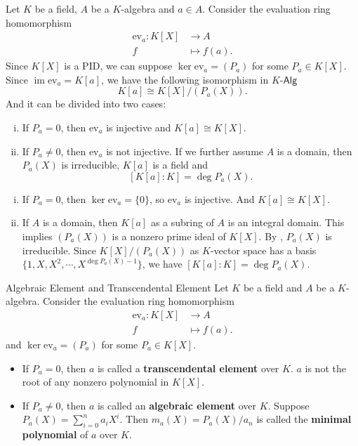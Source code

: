 \begin{proposition}{}{}
    Let $K$ be a field, $A$ be a $K$-algebra and $a\in A$. Consider the evaluation ring homomorphism
    \begin{align*}
        \mathrm{ev}_a:K[X] &\longrightarrow A\\
        f &\longmapsto f(a).
    \end{align*}
    Since $K[X]$ is a PID, we can suppose $\ker \mathrm{ev}_a=(P_a)$ for some $P_a\in K[X]$. Since $\operatorname{im}\mathrm{ev}_a=K[a]$, we have the following isomorphism in $K$-$\mathsf{Alg}$
    \[
        K[a]\cong K[X]/(P_a(X)).
    \]
    And it can be divided into two cases:
    \begin{enumerate}[(i)]
        \item If $P_a=0$, then $\mathrm{ev}_a$ is injective and $K[a]\cong K[X]$.
        \item If $P_a\ne 0$, then $\mathrm{ev}_a$ is not injective. If we further assume $A$ is a domain, then $P_a(X)$ is irreducible, $K[a]$ is a field and
        \[
        \left[ K[a]:K \right]=\deg P_a(X).
        \]
    \end{enumerate}
\end{proposition}
\begin{prf}
    \begin{enumerate}[(i)]
        \item If $P_a=0$, then $\ker \mathrm{ev}_a=\{0\}$, so $\mathrm{ev}_a$ is injective. And $K[a]\cong K[X]$.
        \item If $A$ is a domain, then $K[a]$ as a subring of $A$ is an integral domain. This implies $(P_a(X))$ is a nonzero prime ideal of $K[X]$. By , $P_a(X)$ is irreducible. Since $K[X]/(P_a(X))$ as $K$-vector space has a basis $\{1,X,X^2,\cdots,X^{\deg P_a(X)-1}\}$, we have $\left[ K[a]:K \right]=\deg P_a(X)$.
    \end{enumerate}
   
\end{prf}

\begin{definition}{Algebraic Element and Transcendental Element}{}
    Let $K$ be a field and $A$ be a $K$-algebra. Consider the evaluation ring homomorphism
    \begin{align*}
        \mathrm{ev}_a:K[X] &\longrightarrow A\\
        f &\longmapsto f(a).
    \end{align*}
    and $\ker \mathrm{ev}_a=(P_a)$ for some $P_a\in K[X]$.
    \begin{itemize}
        \item If $P_a=0$, then $a$ is called a \textbf{transcendental element} over $K$. $a$ is not the root of any nonzero polynomial in $K[X]$. 
        \item If $P_a\ne 0$, then $a$ is called an \textbf{algebraic element} over $K$. Suppose $P_a(X)=\sum_{i=0}^n a_iX^i$. Then $m_a(X)=P_a(X)/a_n$ is called the \textbf{minimal polynomial} of $a$ over $K$.
    \end{itemize}
\end{definition}





